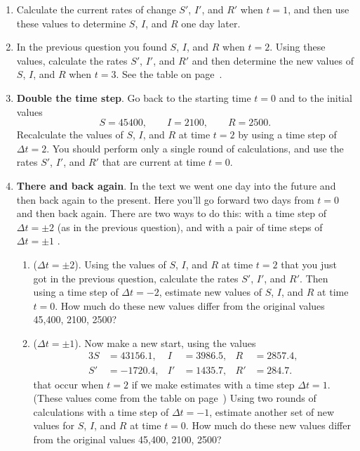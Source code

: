 \begin{enumerate}
\item Calculate the current rates of change $S'$, $I'$, and $R'$ when
$t = 1$, and then use these values to determine $S$, $I$, and $R$ one
day later\label{`measles'}.


\item In the previous question you found $S$, $I$, and $R$ when $t =
2$.  Using these values, calculate the rates $S'$, $I'$, and $R'$ and
then determine the new values of $S$, $I$, and $R$ when $t = 3$.  See
the table on page~\pageref{`threeday'}.


\item {\bf Double the time step}.  Go back to the starting time $t = 0$
and to the initial values
\[
S = 45400, \qquad I = 2100, \qquad R = 2500.
\]
Recalculate the values of $S$, $I$, and $R$ at time $t = 2$ by using a
time step of $\Delta t = 2$.  You should perform only a single round
of calculations, and use the rates $S'$, $I'$, and $R'$ that are
current at time $t = 0$.



\item {\bf There and back again}.\label{`therebackprob'} In the text we went one day into the
future and then back again to the present.  Here you'll go forward two
days from $t = 0$ and then back again.  There are two ways to do this:
with a time step of $\Delta t = \pm 2$ (as in the previous question),
and with a pair of time steps of $\Delta t = \pm 1$ .

  \begin{enumerate}
  \item ($\Delta t = \pm 2$).  Using the values of $S$, $I$, and $R$ at
time $t = 2$ that you just got in the previous question, calculate the
rates $S'$, $I'$, and $R'$.  Then using a time step of $\Delta t =
-2$, estimate new values of $S$, $I$, and $R$ at time $t = 0$.  How
much do these new values differ from the original values 45,400, 2100,
2500?

  \item ($\Delta t = \pm 1$).  Now make a new start, using the values
\begin{alignat*}{3}
S  &= 43156.1, &  I  &= 3986.5, &  R  &= 2857.4, \\ 
S' &= -1720.4, &  I' &= 1435.7, &  R' &= 284.7.
\end{alignat*}
that occur when $t = 2$ if we make estimates with a time step $\Delta
t = 1$.  (These values come from the table on
page~\pageref{`threeday'}) Using two rounds of calculations with a
time step of $\Delta t = -1$, estimate another set of new values for
$S$, $I$, and $R$ at time $t = 0$.  How much do these new values
differ from the original values 45,400, 2100, 2500?


\end{enumerate}
\end{enumerate}
